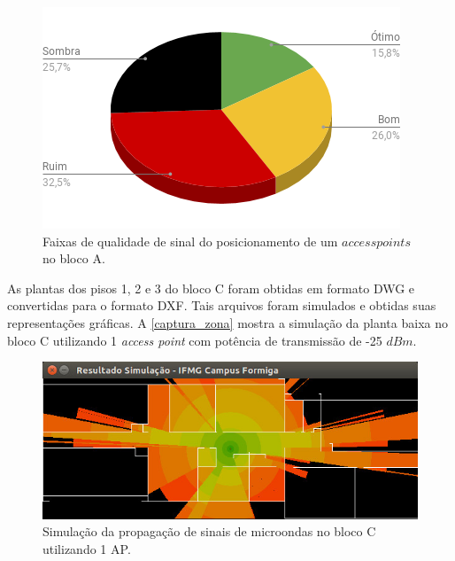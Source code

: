 \documentclass[
	12pt,				%
	twoside,			%
	a4paper,			%
	english,			%
	french,				%
	spanish,			%
	brazil				%
	]{abntex2}
\begin{document}
\begin{figure}[ht]
    \caption{\label{percent_2_aps_bloco_c} Faixas de qualidade de sinal do posicionamento
     de um $access points$ no bloco A.}
    \begin{center}
        \includegraphics[scale=0.51]{imagens/prop-bloco-percent-a-2.png}
    \end{center}
\end{figure}

\clearpage

As plantas dos pisos 1, 2 e 3 do bloco C foram obtidas em formato DWG e
convertidas para o formato DXF. Tais arquivos foram simulados e obtidas
suas representações gráficas. A \autoref{captura_zona} mostra a
simulação da planta baixa no bloco C utilizando 1 \emph{access point}
com potência de transmissão de -25 \(dBm\).

\begin{figure}[ht]
    \caption{\label{captura_zona} Simulação da propagação de sinais de microondas no bloco C utilizando 1 AP.
        }
    \begin{center}
        \includegraphics[scale=0.7]{imagens/captura-zona-2.jpg}
    \end{center}
\end{figure}
\end{document}
